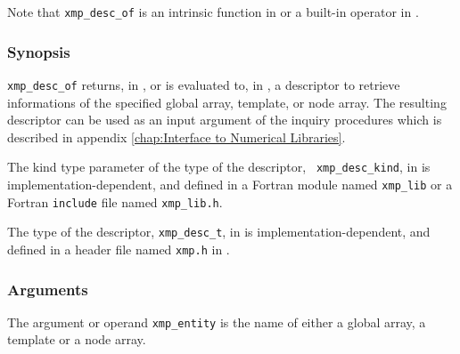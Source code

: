 Note that {\tt xmp\_desc\_of} is an intrinsic function in {\XMPF} or
a built-in operator in {\XMPC}.

\subsubsection*{Synopsis}


{\tt xmp\_desc\_of} returns, in {\XMPF}, or is evaluated to, in {\XMPC},
a descriptor to retrieve informations of the specified global array,
template, or node array. The resulting descriptor can be used as an
input argument of the inquiry procedures which is described in appendix
\ref{chap:Interface to Numerical Libraries}.

The kind type parameter of the type of the descriptor, {\tt
xmp\_desc\_kind}, in {\XMPF} is implementation-dependent, and defined in
a Fortran module named {\tt xmp\_lib} or a Fortran {\tt include} file
named {\tt xmp\_lib.h}.

The type of the descriptor, {\tt xmp\_desc\_t}, in {\XMPC} is
implementation-dependent, and defined in a header file named {\tt xmp.h}
in {\XMPC}.


\subsubsection*{Arguments}

The argument or operand {\tt xmp\_entity} is the name of either a global
array, a template or a node array.



